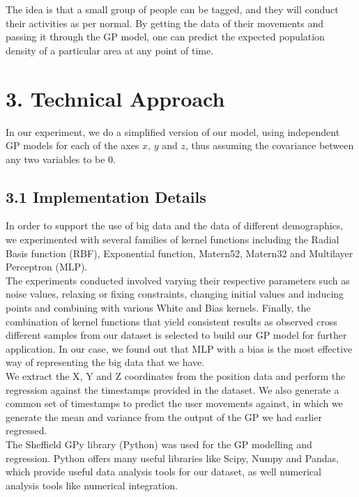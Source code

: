 \documentclass[letterpaper]{article}
\begin{document}
The idea is that a small group of people can be tagged, and they will conduct their activities as per normal. By getting the data of their movements and passing it through the GP model, one can predict the expected population density of a particular area at any point of time.

\section{3.  Technical Approach}

In our experiment, we do a simplified version of our model, using independent GP models for each of the axes $x$, $y$ and $z$, thus assuming the covariance between any two variables to be $0$. 

\subsection{3.1  Implementation Details}

In order to support the use of big data and the data of different demographics, we experimented with several families of kernel functions including the Radial Basis function (RBF), Exponential function, Matern52, Matern32 and Multilayer Perceptron (MLP).\\

The experiments conducted involved varying their respective parameters such as noise values, relaxing or fixing constraints, changing initial values and inducing points and combining with various White and Bias kernels. Finally, the combination of kernel functions that yield consistent results as observed cross different samples from our dataset is selected to build our GP model for further application. In our case, we found out that MLP with a bias is the most effective way of representing the big data that we have.\\

We extract the X, Y and Z coordinates from the position data and perform the regression against the timestamps provided in the dataset. We also generate a common set of timestamps to predict the user movements against, in which we generate the mean and variance from the output of the GP we had earlier regressed. \\

The Sheffield GPy library (Python) was used for the GP modelling and regression. Python offers many useful libraries like Scipy, Numpy and Pandas, which provide useful data analysis tools for our dataset, as well numerical analysis tools like numerical integration.\\
\end{document}
